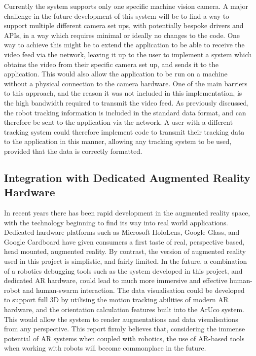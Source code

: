 Currently the system supports only one specific machine vision camera. A major challenge in the future development of this system will be to find a way to support multiple different camera set ups, with potentially bespoke drivers and APIs, in a way which requires minimal or ideally no changes to the code. One way to achieve this might be to extend the application to be able to receive the video feed via the network, leaving it up to the user to implement a system which obtains the video from their specific camera set up, and sends it to the application. This would also allow the application to be run on a machine without a physical connection to the camera hardware. One of the main barriers to this approach, and the reason it was not included in this implementation, is the high bandwidth required to transmit the video feed. As previously discussed, the robot tracking information is included in the standard data format, and can therefore be sent to the application via the network. A user with a different tracking system could therefore implement code to transmit their tracking data to the application in this manner, allowing any tracking system to be used, provided that the data is correctly formatted.


\subsection{Integration with Dedicated Augmented Reality Hardware} \label{ARHardwareExtension}

In recent years there has been rapid development in the augmented reality space, with the technology beginning to find its way into real world applications. Dedicated hardware platforms such as Microsoft HoloLens, Google Glass, and Google Cardboard have given consumers a first taste of real, perspective based, head mounted, augmented reality. By contrast, the version of augmented reality used in this project is simplistic, and fairly limited. In the future, a combination of a robotics debugging tools such as the system developed in this project, and dedicated AR hardware, could lead to much more immersive and effective human-robot and human-swarm interaction. The data visualisation could be developed to support full 3D by utilising the motion tracking abilities of modern AR hardware, and the orientation calculation features built into the ArUco system. This would allow the system to render augmentations and data visualisations from any perspective. This report firmly believes that, considering the immense potential of AR systems when coupled with robotics, the use of AR-based tools when working with robots will become commonplace in the future.

